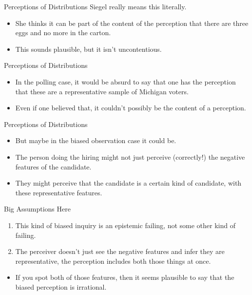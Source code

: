 \documentclass[
  17pt,
  letterpaper,
  ignorenonframetext,
  aspectratio=169,
  xcolor={dvipsnames}]{beamer}
\providecommand{\tightlist}{%
  \setlength{\itemsep}{0pt}\setlength{\parskip}{0pt}}\usepackage{longtable,booktabs,array}
\begin{document}
\begin{frame}{Perceptions of Distributions}
\protect\hypertarget{perceptions-of-distributions-1}{}
Siegel really means this literally.

\begin{itemize}[<+->]
\tightlist
\item
  She thinks it can be part of the content of the perception that there
  are three eggs and no more in the carton.
\item
  This sounds plausible, but it isn't uncontentious.
\end{itemize}
\end{frame}

\begin{frame}{Perceptions of Distributions}
\protect\hypertarget{perceptions-of-distributions-2}{}
\begin{itemize}[<+->]
\tightlist
\item
  In the polling case, it would be absurd to say that one has the
  perception that these are a representative sample of Michigan voters.
\item
  Even if one believed that, it couldn't possibly be the content of a
  perception.
\end{itemize}
\end{frame}

\begin{frame}{Perceptions of Distributions}
\protect\hypertarget{perceptions-of-distributions-3}{}
\begin{itemize}[<+->]
\tightlist
\item
  But maybe in the biased observation case it could be.
\item
  The person doing the hiring might not just perceive (correctly!) the
  negative features of the candidate.
\item
  They might perceive that the candidate is a certain kind of candidate,
  with these representative features.
\end{itemize}
\end{frame}

\begin{frame}{Big Assumptions Here}
\protect\hypertarget{big-assumptions-here}{}
\begin{enumerate}[<+->]
\tightlist
\item
  This kind of biased inquiry is an epistemic failing, not some other
  kind of failing.
\item
  The perceiver doesn't just see the negative features and infer they
  are representative, the perception includes both those things at once.
\end{enumerate}

\begin{itemize}[<+->]
\tightlist
\item
  If you spot both of those features, then it seems plausible to say
  that the biased perception is irrational.
\end{itemize}
\end{frame}
\end{document}
